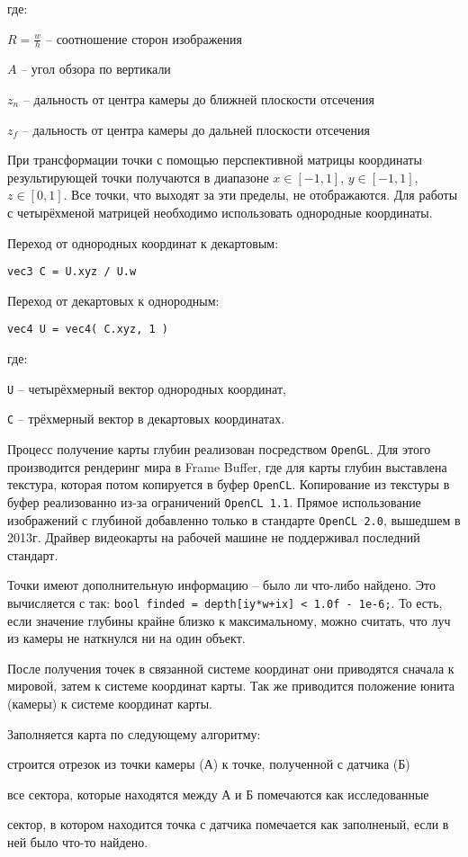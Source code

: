 где:

$R = \frac{w}{h}$ -- соотношение сторон изображения

$A$ -- угол обзора по вертикали

$z_{n}$ -- дальность от центра камеры до ближней плоскости отсечения

$z_{f}$ -- дальность от центра камеры до дальней плоскости отсечения

При трансформации точки с помощью перспективной матрицы координаты результирующей точки
получаются в диапазоне $x \in [-1,1]$, $y \in [-1,1]$, $z \in [0,1]$. Все точки, что выходят
за эти пределы, не отображаются. Для работы с четырёхменой матрицей необходимо использовать
однородные координаты.

Переход от однородных координат к декартовым: 

\verb|vec3 C = U.xyz / U.w|

Переход от декартовых к однородным:

\verb|vec4 U = vec4( C.xyz, 1 )|

где:

\verb|U| -- четырёхмерный вектор однородных координат,

\verb|C| -- трёхмерный вектор в декартовых координатах.

Процесс получение карты глубин реализован посредством \verb|OpenGL|. Для этого 
производится рендеринг мира в Frame Buffer, где для карты глубин выставлена текстура, 
которая потом копируется в буфер \verb|OpenCL|. Копирование из текстуры в буфер реализованно
из-за ограничений \verb|OpenCL 1.1|. Прямое использование изображений с глубиной добавленно
только в стандарте \verb|OpenCL 2.0|, вышедшем в 2013г. Драйвер видеокарты на рабочей машине
не поддерживал последний стандарт.

Точки имеют дополнительную информацию -- было ли что-либо найдено.
Это вычисляется с так: \verb|bool finded = depth[iy*w+ix] < 1.0f - 1e-6;|.
То есть, если значение глубины крайне близко к максимальному, можно считать, что
луч из камеры не наткнулся ни на один объект.

После получения точек в связанной системе координат они приводятся
сначала к мировой, затем к системе координат карты.
Так же приводится положение юнита (камеры) к системе координат карты.

Заполняется карта по следующему алгоритму:
\begin{mintemize}
    \item строится отрезок из точки камеры (А) к точке, полученной с датчика (Б)
    \item все сектора, которые находятся между А и Б помечаются как исследованные
    \item сектор, в котором находится точка с датчика помечается как заполненый,
        если в ней было что-то найдено.
\end{mintemize}
